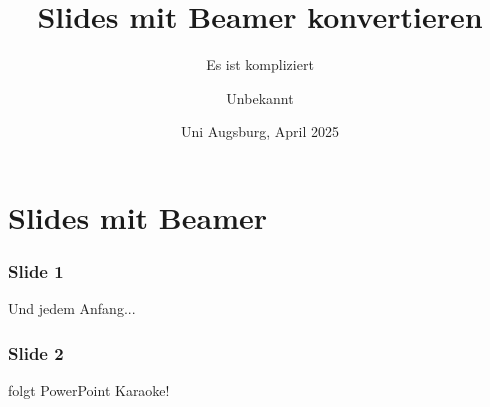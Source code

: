 \documentclass{beamer}
\title[Beamer Test] %
{Slides mit Beamer konvertieren}
\subtitle{Es ist kompliziert}
\author{Unbekannt}
\institute{Testlabor}
\date[2025]{Uni Augsburg, April 2025}
\begin{document}
\maketitle
\section{Slides mit Beamer}
\begin{frame}
\frametitle{Slide 1}
Und jedem Anfang...
\end{frame}
\begin{frame}
\frametitle{Slide 2}
folgt PowerPoint Karaoke!
\end{frame}
\end{document}
